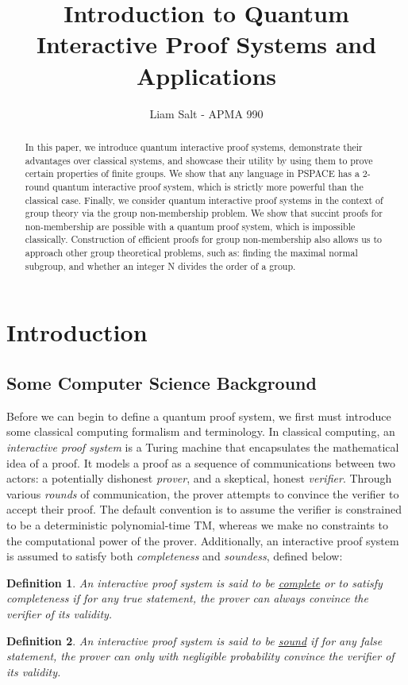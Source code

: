 \documentclass[12pt]{article}
\title{Introduction to Quantum Interactive Proof Systems and Applications}
\author{Liam Salt - APMA 990}
\newtheorem*{defn}{Definition}
\begin{document}
	\maketitle
	
	\begin{abstract}
		In this paper, we introduce quantum interactive proof systems, demonstrate their advantages over classical systems, and showcase their utility by using them to prove certain properties of finite groups. We show that any language in PSPACE has a $2$-round quantum interactive proof system, which is strictly more powerful than the classical case. Finally, we consider quantum interactive proof systems in the context of group theory via the group non-membership problem. We show that succint proofs for non-membership are possible with a quantum proof system, which is impossible classically. Construction of efficient proofs for group non-membership also allows us to approach other group theoretical problems, such as: finding the maximal normal subgroup, and whether an integer N divides the order of a group.
	\end{abstract}
	\section{Introduction}
	
	\subsection{Some Computer Science Background}
	
	Before we can begin to define a quantum proof system, we first must introduce some classical computing formalism and terminology. In classical computing, an \textit{interactive proof system} is a Turing machine that encapsulates the mathematical idea of a proof. It models a proof as a sequence of communications between two actors: a potentially dishonest \textit{prover}, and a skeptical, honest \textit{verifier}. Through various \textit{rounds} of communication, the prover attempts to convince the verifier to accept their proof. The default convention is to assume the verifier is constrained to be a deterministic polynomial-time TM, whereas we make no constraints to the computational power of the prover. Additionally, an interactive proof system is assumed to satisfy both \textit{completeness} and \textit{soundess}, defined below:
	\begin{defn}
		An interactive proof system is said to be \underline{complete} or to satisfy completeness if for any true statement, the prover can always convince the verifier of its validity.
	\end{defn}
	\begin{defn} An interactive proof system is said to be \underline{sound} if for any false statement, the prover can only with negligible probability convince the verifier of its validity.
	\end{defn}
\end{document}
